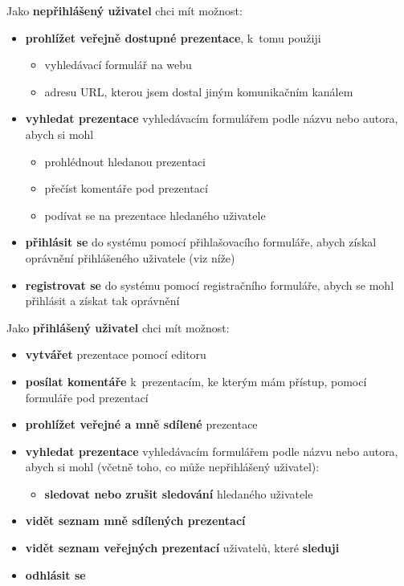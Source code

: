 \documentclass[11pt,twoside,a4paper]{book}
\begin{document}
\noindent Jako \textbf{nepřihlášený uživatel} chci mít možnost:
\begin{itemize}
	\item \textbf{prohlížet veřejně dostupné prezentace}, k~tomu použiji 
		\begin{itemize}
			\item vyhledávací formulář na webu
			\item adresu URL, kterou jsem dostal jiným komunikačním kanálem
		\end{itemize}
	\item \textbf{vyhledat prezentace} vyhledávacím formulářem podle názvu nebo autora, abych si mohl
		\begin{itemize}
			\item prohlédnout hledanou prezentaci
			\item přečíst komentáře pod prezentací
			\item podívat se na prezentace hledaného uživatele
		\end{itemize}
	\item \textbf{přihlásit se} do systému pomocí přihlašovacího formuláře, abych získal oprávnění přihlášeného uživatele (viz níže)
	\item \textbf{registrovat se} do systému pomocí registračního formuláře, abych se mohl přihlásit a získat tak oprávnění
\end{itemize}


\noindent Jako \textbf{přihlášený uživatel} chci mít možnost:
\begin{itemize}
	\item \textbf{vytvářet} prezentace pomocí editoru
	\item \textbf{posílat komentáře} k~prezentacím, ke kterým mám přístup, pomocí formuláře pod prezentací
	\item \textbf{prohlížet veřejné a mně sdílené} prezentace
	\item \textbf{vyhledat prezentace} vyhledávacím formulářem podle názvu nebo autora, abych si mohl (včetně toho, co může nepřihlášený uživatel):
		\begin{itemize}
		\item \textbf{sledovat nebo zrušit sledování} hledaného uživatele
		\end{itemize}
	\item \textbf{vidět seznam mně sdílených prezentací}
	\item \textbf{vidět seznam veřejných prezentací} uživatelů, které \textbf{sleduji}
	\item \textbf{odhlásit se} 
\end{itemize}
\end{document}
